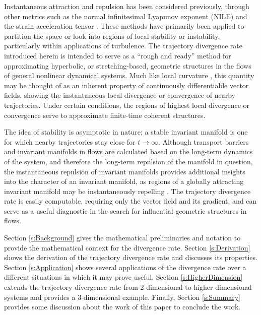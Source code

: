 \documentclass[twocolumn]{svjour3}
\begin{document}
Instantaneous attraction and repulsion has been considered previously, through other metrics such as the normal infinitesimal Lyapunov exponent (NILE) \cite{haller2010localized} and the strain acceleration tensor \cite{haller2001lagrangian}. These methods have primarily been applied to partition the space or look into regions of local stability or instability, particularly within applications of turbulence. The trajectory divergence rate introduced herein is intended to serve as a ``rough and ready'' method for approximating hyperbolic, or stretching-based, geometric structures in the flows of general nonlinear dynamical systems. Much like local curvature \cite{desroches2011canards}, this quantity may be thought of as an inherent property of continuously differentiable vector fields, showing the instantaneous local divergence or convergence of nearby trajectories. Under certain conditions, the regions of highest local divergence or convergence serve to approximate finite-time coherent structures.

The idea of stability is asymptotic in nature; a stable invariant manifold is one for which nearby trajectories stay close for $t\to\infty$. Although transport barriers and invariant manifolds in flows are calculated based on the long-term dynamics of the system, and therefore the long-term repulsion of the manifold in question, the instantaneous repulsion of invariant manifolds provides additional insights into the character of an invariant manifold, as regions of a globally attracting invariant manifold may be instantaneously repelling \cite{tallapragada2017globally,haller2001lagrangian}. The trajectory divergence rate is easily computable, requiring only the vector field and its gradient, and can serve as a useful diagnostic in the search for influential geometric structures in flows.

Section \ref{s:Background} gives the mathematical preliminaries and notation to provide the mathematical context for the divergence rate. Section \ref{s:Derivation} shows the derivation of the trajectory divergence rate and discusses its properties. Section \ref{s:Application} shows several applications of the divergence rate over a different situations in which it may prove useful. Section \ref{s:HigherDimension} extends the trajectory divergence rate from 2-dimensional to higher dimensional systems and provides a 3-dimensional example. Finally, Section \ref{s:Summary} provides some discussion about the work of this paper to conclude the work.
\end{document}
